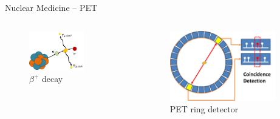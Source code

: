 \begin{frame}[c]{Nuclear Medicine -- PET}
	\begin{columns}[b, onlytextwidth]
		\begin{column}{0.5\textwidth}
			\begin{figure}
				\centering
				\includegraphics[width=0.7\textwidth]{images/betaemission.png}
				\caption{$\beta^+$ decay}
			\end{figure}
		\end{column}\begin{column}{0.5\textwidth}
			\centering{}
			\begin{figure}[]
				\centering
				\includegraphics[width=0.9\textwidth]{images/ring.png}
				\caption{PET ring detector}
			\end{figure}
		\end{column}
	\end{columns}
\end{frame}

